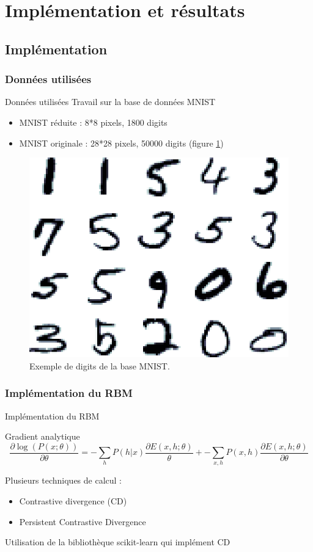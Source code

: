 \section{Implémentation et résultats}

\subsection{Implémentation}

\subsubsection*{Données utilisées}

\begin{frame}{Données utilisées}
	Travail sur la base de données MNIST
	\begin{itemize}
		\item MNIST réduite : 8*8 pixels, 1800 digits
		\item MNIST originale : 28*28 pixels, 50000 digits (figure \ref{MNISTORI})
	\end{itemize}
	\begin{figure}[ht!]
	\centering
	\includegraphics[width = .4\columnwidth]{../fig/mnist_originals.png}
	\caption{Exemple de digits de la base MNIST.}
	\label{MNISTORI}
	\end{figure}
\end{frame}

\subsubsection*{Implémentation du RBM}

\begin{frame}{Implémentation du RBM}
	\begin{block}{Gradient analytique}
		\begin{equation}
			\displaystyle\frac{\partial \log \left ( P(x; \theta) \right )}{\partial \theta} = \displaystyle- \sum_{h} P(h|x) \frac{\partial E(x, h; \theta)}{\theta} + - \sum_{x, h} P(x, h) \frac{\partial E(x, h; \theta)}{\partial\theta} 
		\end{equation}
	\end{block}
	Plusieurs techniques de calcul :
	\begin{itemize}
		\item Contrastive divergence (CD)
		\item Persistent Contrastive Divergence
	\end{itemize}
	Utilisation de la bibliothèque scikit-learn qui implément CD
\end{frame}

